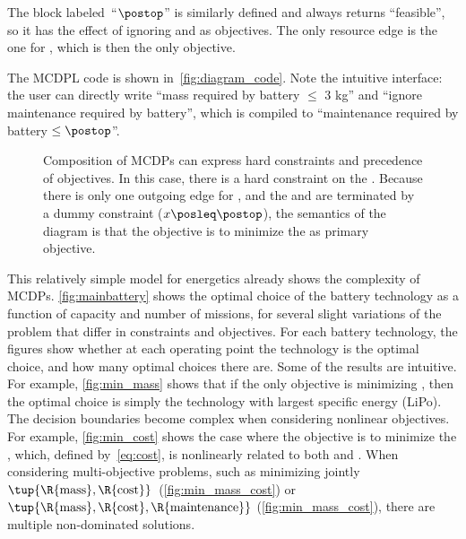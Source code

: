\noindent The block labeled~``$\postop$'' is similarly defined and
always returns ``feasible'', so it has the effect of ignoring 
and  as objectives. The only resource edge is the
one for , which is then the only objective.

The MCDPL code is shown in~\cref{fig:diagram_code}. Note the intuitive
interface: the user can directly write ``mass required by battery
$\leq$ 3 kg'' and ``ignore maintenance required by battery'',
which is compiled to ``maintenance required by battery $\leq\postop$''.

\begin{figure}
  \begin{centering}
  \end{centering}
  \begin{centering}
  \end{centering}
  \smallskip{}

  \caption{Composition of MCDPs can express hard constraints and precedence of
  objectives. In this case, there is a hard constraint on the .
  Because there is only one outgoing edge for , and the 
  and  are terminated by a dummy constraint ($x\posleq\postop$),
    the semantics of the diagram is that the objective is to minimize
    the  as primary objective.}
\end{figure}

This relatively simple model for energetics already shows the complexity
of MCDPs. \cref{fig:mainbattery} shows the optimal choice of the battery
technology as a function of capacity and number of missions, for several
slight variations of the problem that differ in constraints and objectives.
For each battery technology, the figures show whether at each operating
point the technology is the optimal choice, and how many optimal choices
there are. Some of the results are intuitive. For example, \cref{fig:min_mass}
shows that if the only objective is minimizing , then the
optimal choice is simply the technology with largest specific energy
(LiPo). The decision boundaries become complex when considering nonlinear
objectives. For example, \cref{fig:min_cost} shows the case where the
objective is to minimize the , which, defined by~\cref{eq:cost},
is nonlinearly related to both  and .
When considering multi-objective problems, such as minimizing jointly
$\tup{ \R{\text{mass}},\R{\text{cost}}} $~(\cref{fig:min_mass_cost})
or~$\tup{ \R{\text{mass}},\R{\text{cost}},\R{\text{maintenance}}} $
(\cref{fig:min_mass_cost}), there are multiple non-dominated solutions.

